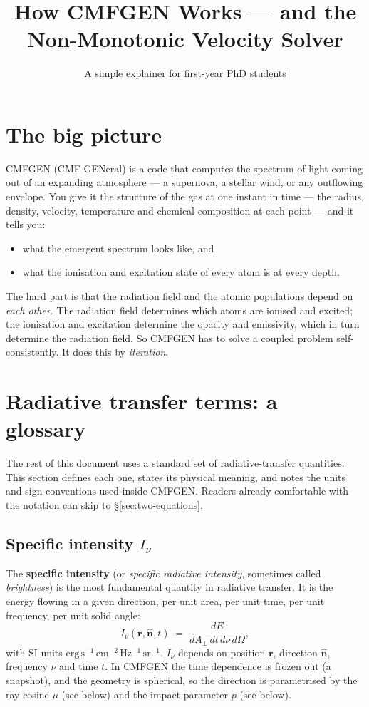 \documentclass[11pt]{article}
\title{How CMFGEN Works --- and the Non-Monotonic Velocity Solver}
\author{A simple explainer for first-year PhD students}
\date{}
\begin{document}
\maketitle

\section*{The big picture}

CMFGEN (CMF GENeral) is a code that computes the spectrum of light coming
out of an expanding atmosphere --- a supernova, a stellar wind, or any
outflowing envelope.  You give it the structure of the gas at one
instant in time --- the radius, density, velocity, temperature and
chemical composition at each point --- and it tells you:

\begin{itemize}[nosep]
  \item what the emergent spectrum looks like, and
  \item what the ionisation and excitation state of every atom is at
        every depth.
\end{itemize}

The hard part is that the radiation field and the atomic populations
depend on \emph{each other}.  The radiation field determines which atoms
are ionised and excited; the ionisation and excitation determine the
opacity and emissivity, which in turn determine the radiation field.  So
CMFGEN has to solve a coupled problem self-consistently.  It does this by
\emph{iteration}.

\section{Radiative transfer terms: a glossary}
\label{sec:rt-terms}

The rest of this document uses a standard set of radiative-transfer
quantities.  This section defines each one, states its physical meaning,
and notes the units and sign conventions used inside CMFGEN.  Readers
already comfortable with the notation can skip to
\S\ref{sec:two-equations}.

\subsection{Specific intensity \texorpdfstring{$I_\nu$}{I\_nu}}

The \textbf{specific intensity} (or \emph{specific radiative intensity},
sometimes called \emph{brightness}) is the most fundamental quantity in
radiative transfer.  It is the energy flowing in a given direction, per
unit area, per unit time, per unit frequency, per unit solid angle:
\begin{equation}
  I_\nu(\mathbf{r},\hat{\mathbf{n}},t)
  \;=\;
  \frac{dE}{dA_\perp\,dt\,d\nu\,d\Omega},
\end{equation}
with SI units $\mathrm{erg\,s^{-1}\,cm^{-2}\,Hz^{-1}\,sr^{-1}}$.
$I_\nu$ depends on position $\mathbf{r}$, direction $\hat{\mathbf{n}}$,
frequency $\nu$ and time $t$.  In CMFGEN the time dependence is frozen
out (a snapshot), and the geometry is spherical, so the direction is
parametrised by the ray cosine $\mu$ (see below) and the impact
parameter $p$ (see below).
\end{document}
